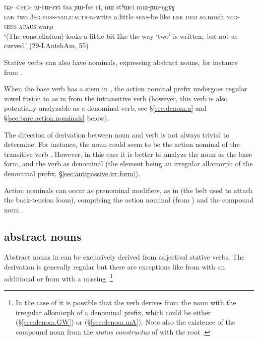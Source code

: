 \begin{exe}
\ex \label{ex:er.WtWrAt}
\gll  tɕe <er> ɯ-tɯ-rɤt tsa ɲɯ-fse ri, nɯ stʰɯci mɯ-ɲɯ-ŋgɤɣ \\
\textsc{lnk} two \textsc{3sg}.\textsc{poss}-\textsc{nmlz}:\textsc{action}-write a.little \textsc{sens}-be.like \textsc{lnk} \textsc{dem} so.much \textsc{neg}-\textsc{sens}-\textsc{acaus}:warp \\
\glt `(The constellation) looks a little bit like the way `two' is written, but not as curved.' (29-LAntshAm, 55)
\end{exe} 
 
Stative verbs can also have  nominals, expressing abstract nouns, for instance  from .

When the base verb has a stem in , the action nominal prefix  undergoes regular vowel fusion  to  as in  from the intransitive verb  (however, this verb is also potentially analyzable as a  denominal verb, see §\ref{sec:denom.a} and §\ref{sec:bare.action.nominals} below).

The direction of derivation between noun and verb is not always trivial to determine. For instance, the noun  could seem to be the action nominal of the transitive verb . However, in this case it is better to analyze the noun as the base form, and the verb as denominal (the  element being an irregular allomorph of the  denominal prefix, §\ref{sec:antipassive.irr.form}).

Action nominals can occur as prenominal modifiers, as in  (the belt used to attach  the back-tension loom), comprising the action nominal  (from ) and the compound noun .

\subsection{ abstract nouns} \label{sec:tA.abstract.nouns}
Abstract nouns in  can be exclusively derived from adjectival stative verbs. The derivation is generally regular but there are exceptions like  from  with an additional  or   from  with a missing .\footnote{In the case of  it is possible that the verb  derives from the noun with the irregular allomorph of a denominal prefix, which could be either  (§\ref{sec:denom.GW}) or  (§\ref{sec:denom.mA}). Note also the existence of the compound noun  from the \textit{status constructus} of  with the root . }


